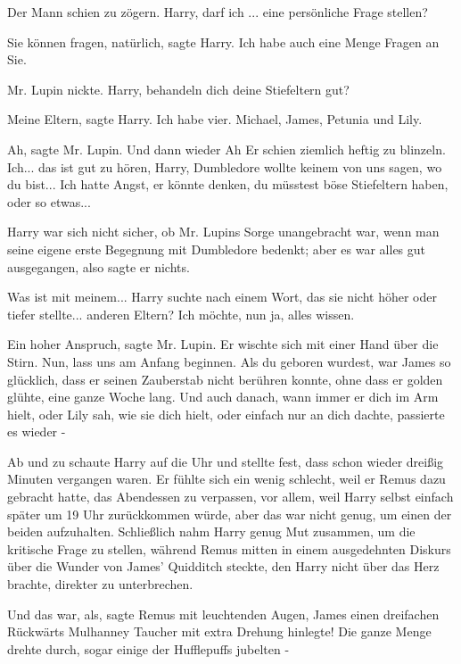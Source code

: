 Der Mann schien zu zögern. \glqq{}Harry, darf ich ... eine persönliche Frage
stellen?\grqq{}

\glqq{}Sie können fragen, natürlich\grqq{}, sagte Harry. \glqq{}Ich habe auch eine
Menge Fragen an Sie.\grqq{}

Mr. Lupin nickte. \glqq{}Harry, behandeln dich deine Stiefeltern gut?\grqq{}

\glqq{}Meine Eltern\grqq{}, sagte Harry. \glqq{}Ich habe vier. Michael, James,
Petunia und Lily.\grqq{}

\glqq{}Ah\grqq{}, sagte Mr. Lupin. Und dann wieder \glqq{}Ah\grqq{} Er schien ziemlich
heftig zu blinzeln. \glqq{}Ich... das ist gut zu hören, Harry, Dumbledore wollte
keinem von uns sagen, wo du bist... Ich hatte Angst, er könnte denken, du
müsstest böse Stiefeltern haben, oder so etwas...\grqq{}

Harry war sich nicht sicher, ob Mr. Lupins Sorge unangebracht war, wenn man
seine eigene erste Begegnung mit Dumbledore bedenkt; aber es war alles gut
ausgegangen, also sagte er nichts.

\glqq{}Was ist mit meinem...\grqq{} Harry suchte nach einem Wort, das sie nicht höher
oder tiefer stellte... \glqq{}anderen Eltern? Ich möchte, nun ja, alles wissen.\grqq{}

\glqq{}Ein hoher Anspruch\grqq{}, sagte Mr. Lupin. Er wischte sich mit einer Hand
über die Stirn. \glqq{}Nun, lass uns am Anfang beginnen. Als du geboren wurdest,
war James so glücklich, dass er seinen Zauberstab nicht berühren konnte, ohne
dass er golden glühte, eine ganze Woche lang. Und auch danach, wann immer er
dich im Arm hielt, oder Lily sah, wie sie dich hielt, oder einfach nur an dich
dachte, passierte es wieder -\grqq{}

Ab und zu schaute Harry auf die Uhr und stellte fest, dass schon wieder dreißig
Minuten vergangen waren. Er fühlte sich ein wenig schlecht, weil er Remus dazu
gebracht hatte, das Abendessen zu verpassen, vor allem, weil Harry selbst
einfach später um 19 Uhr zurückkommen würde, aber das war nicht genug, um einen
der beiden aufzuhalten. Schließlich nahm Harry genug Mut zusammen, um die
kritische Frage zu stellen, während Remus mitten in einem ausgedehnten Diskurs
über die Wunder von James' Quidditch steckte, den Harry nicht über das Herz
brachte, direkter zu unterbrechen.

\glqq{}Und das war, als\grqq{}, sagte Remus mit leuchtenden Augen, \glqq{}James
einen dreifachen Rückwärts Mulhanney Taucher mit extra Drehung hinlegte! Die
ganze Menge drehte durch, sogar einige der Hufflepuffs jubelten -\grqq{}

